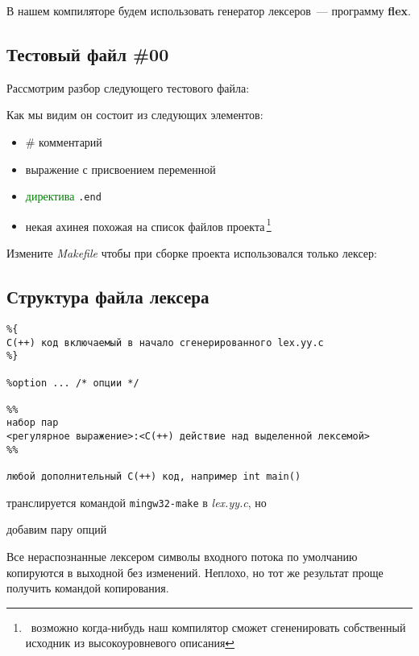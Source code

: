 \documentclass[oneside,10pt]{article}
\newcommand{\note}[1]{\,\footnote{\ #1}}
\newcommand{\term}[1]{\textcolor{green}{#1}}
\newcommand{\prog}[1]{\textbf{#1}}
\newcommand{\file}[1]{\textit{#1}}
\newcommand{\flex}{\prog{flex}}
\newcommand{\lst}[2]{}
\begin{document}
\bigskip
В нашем компиляторе будем использовать генератор лексеров\ --- программу \flex.

\subsection{Тестовый файл \#00}

Рассмотрим разбор следующего тестового файла:
\lst{\file{src.src}: тест \#00}{doc/00.src}

\clearpage
Как мы видим он состоит из следующих элементов:
\begin{itemize}[nosep]
  \item \# комментарий
  \item выражение с присвоением переменной
  \item \term{директива} \verb|.end|
  \item некая ахинея похожая на список файлов проекта\note{возможно когда-нибудь
  наш компилятор сможет сгененировать собственный исходник из высокоуровневого
  описания}
\end{itemize}

\bigskip
Измените \file{Makefile} чтобы при сборке проекта использовался только лексер:
\lst{\file{Makefile}: изоляция лексера}{doc/01.mk}

\subsection{Структура файла лексера}

\begin{verbatim}
%{
С(++) код включаемый в начало сгенерированного lex.yy.c
%}

%option ... /* опции */

%%
набор пар
<регулярное выражение>:<С(++) действие над выделенной лексемой> 
%%

любой дополнительный С(++) код, например int main()
\end{verbatim}

\lst{\file{lpp.lpp}: пустой лексер}{doc/00.lpp}
транслируется командой \verb|mingw32-make| в \file{lex.yy.c}, но
\lst{\file{log.log}: ошибки}{doc/00.llg}

\clearpage
добавим пару опций
\lst{\file{lpp.lpp}: пустой лексер}{doc/01.lpp}
\lst{\file{log.log}: bypass исходного кода}{doc/01.llg}

Все нераспознанные лексером символы входного потока по умолчанию копируются в
выходной без изменений. Неплохо, но тот же результат проще получить командой
копирования.
\end{document}
